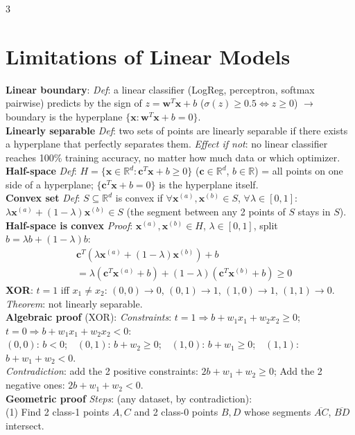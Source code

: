 \documentclass[10pt]{article}
\newcommand{\vx}{\mathbf{x}}
\newcommand{\vw}{\mathbf{w}}
\newcommand{\sub}[1]{\textit{#1}:}  %
\begin{document}
\fontsize{5.5}{6.4}\selectfont
\raggedcolumns
\begin{multicols*}{3}

\section{Limitations of Linear Models}
\textbf{Linear boundary}: \sub{Def} a linear classifier (LogReg, perceptron, softmax pairwise) predicts by the sign of $z=\vw^T\vx+b$ ($\sigma(z)\ge0.5\iff z\ge0$) $\to$ boundary is the hyperplane $\{\vx:\vw^T\vx+b=0\}$.\\
\textbf{Linearly separable} \sub{Def} two sets of points are linearly separable if there exists a hyperplane that perfectly separates them. \sub{Effect if not} no linear classifier reaches 100\% training accuracy, no matter how much data or which optimizer.\\
\textbf{Half-space} \sub{Def} $H=\{\vx\in\mathbb R^d:\mathbf c^T\vx+b\ge0\}$ ($\mathbf c\in\mathbb R^d$, $b\in\mathbb R$) = all points on one side of a hyperplane; $\{\mathbf c^T\vx+b=0\}$ is the hyperplane itself.\\
\textbf{Convex set} \sub{Def} $S\subseteq\mathbb R^d$ is convex if $\forall\vx^{(a)},\vx^{(b)}\in S$, $\forall\lambda\in[0,1]$: $\lambda\vx^{(a)}+(1-\lambda)\vx^{(b)}\in S$ (the segment between any 2 points of $S$ stays in $S$).\\
\textbf{Half-space is convex} \sub{Proof} $\vx^{(a)},\vx^{(b)}\in H$, $\lambda\in[0,1]$, split $b=\lambda b+(1-\lambda)b$:
\begin{align*}
&\mathbf c^T(\lambda\vx^{(a)}+(1-\lambda)\vx^{(b)})+b\\
&=\lambda(\mathbf c^T\vx^{(a)}+b)+(1-\lambda)(\mathbf c^T\vx^{(b)}+b)\ge0
\end{align*}
\textbf{XOR}: $t=1$ iff $x_1\ne x_2$: $(0,0)\!\to\!0$, $(0,1)\!\to\!1$, $(1,0)\!\to\!1$, $(1,1)\!\to\!0$. \sub{Theorem} not linearly separable.\\
\textbf{Algebraic proof} (XOR): \sub{Constraints} $t=1\Rightarrow b+w_1x_1+w_2x_2\ge0$; $t=0\Rightarrow b+w_1x_1+w_2x_2<0$:\\
$(0,0)$: $b<0$;\ \ $(0,1)$: $b+w_2\ge0$;\ \ $(1,0)$: $b+w_1\ge0$;\ \ $(1,1)$: $b+w_1+w_2<0$.\\
\sub{Contradiction} add the 2 positive constraints: $2b+w_1+w_2\ge0$; Add the 2 negative ones: $2b+w_1+w_2<0$.\\
\textbf{Geometric proof} \sub{Steps} (any dataset, by contradiction):\\
(1) Find 2 class-1 points $A,C$ and 2 class-0 points $B,D$ whose segments $\overline{AC}$, $\overline{BD}$ intersect.\\

\end{multicols*}
\end{document}
